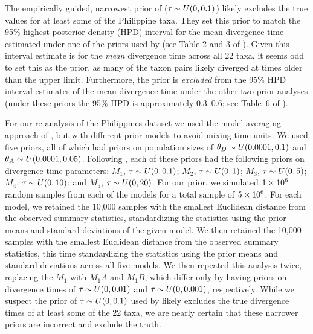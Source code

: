 \documentclass[letterpaper,12pt]{article}
\begin{document}
\begin{linenumbers}
The empirically guided, narrowest prior of \citet{Hickerson2013} ($\tau_{} \sim
U(0,0.1)$) likely excludes the true values for at least some of the Philippine
taxa.
They set this prior to match the 95\% highest posterior density (HPD) interval for
the mean divergence time estimated under one of the priors used by
\citet{Oaks2012} (see Table 2 and 3 of \citet{Oaks2012}).
Given this interval estimate is for the \emph{mean} divergence time across all
22 taxa, it seems odd to set this as the prior, as many of the taxon pairs
likely diverged at times older than the upper limit.
Furthermore, the prior is \emph{excluded} from the 95\% HPD interval estimates
of the mean divergence time under the other two prior analyses (under these
priors the 95\% HPD is approximately 0.3--0.6; see Table~6 of
\citet{Oaks2012}).

For our re-analysis of the Philippines dataset we used the model-averaging
approach of \citet{Hickerson2013}, but with different prior models to avoid
mixing time units. We used five priors, all of which had priors on population
sizes of $\meanDescendantTheta{} \sim U(0.0001, 0.1)$ and
$\ancestralTheta{} \sim U(0.0001, 0.05)$.
Following \citet{Hickerson2013}, each of these priors had the following
priors on divergence time parameters:
$M_1$, $\tau_{} \sim U(0, 0.1)$;
$M_2$, $\tau_{} \sim U(0, 1)$;
$M_3$, $\tau_{} \sim U(0, 5)$;
$M_4$, $\tau_{} \sim U(0, 10)$; and
$M_5$, $\tau_{} \sim U(0, 20)$.
For our prior, we simulated $1\times 10^{6}$ random samples from each of the models
for a total sample of $5\times 10^{6}$.
For each model, we retained the 10,000 samples with the smallest Euclidean
distance from the observed summary statistics, standardizing the statistics
using the prior means and standard deviations of the given model.
We then retained the 10,000 samples with the smallest Euclidean distance from
the observed summary statistics, this time standardizing the statistics using
the prior means and standard deviations across all five models.
We then repeated this analysis twice, replacing the $M_1$ with
$M_1A$ and $M_1B$, which differ only by having priors on divergence
times of $\tau_{} \sim U(0, 0.01)$ and $\tau_{} \sim U(0, 0.001)$,
respectively.
While we suspect the prior of $\tau_{} \sim U(0, 0.1)$ used by
\citet{Hickerson2013} likely excludes the true divergence times of
at least some of the 22 taxa, we are nearly certain that these
narrower priors are incorrect and exclude the truth.


\end{linenumbers}
\end{document}
